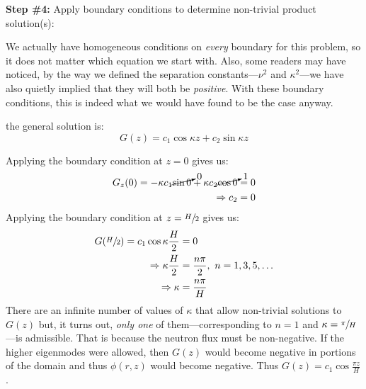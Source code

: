 \vspace{0.25cm}

\noindent\textbf{Step \#4:} Apply boundary conditions to determine non-trivial product solution(s):

\vspace{0.25cm}

\noindent We actually have homogeneous conditions on \emph{every} boundary for this problem, so it does not matter which equation we start with. Also, some readers may have noticed, by the way we defined the separation constants---$\nu^2$ and $\kappa^2$---we have also quietly implied that they will both be \emph{positive}.  With these boundary conditions, this is indeed what we would have found to be the case anyway.

 the general solution is:
\begin{equation*}
G(z) = c_1\cos{\kappa z} + c_2 \sin{\kappa z}
\end{equation*}

Applying the boundary condition at $z=0$ gives us:
\begin{align*}
G_z(0) = -\kappa c_1 \cancelto{0}{\sin{0}} + \kappa c_2 \cancelto{1}{\cos{0}} &= 0 \\
\Rightarrow c_2 &= 0 
\end{align*}
Applying the boundary condition at $z=\sfrac{H}{2}$ gives us:
\begin{align*}
G(\sfrac{H}{2}) = c_1 \cos{\kappa \frac{H}{2}} &= 0 \\
\Rightarrow \kappa \frac{H}{2} &= \frac{n\pi}{2}, \ n=1,3,5,\dots \\
\Rightarrow \kappa &= \frac{n \pi}{H}
\end{align*}
There are an infinite number of values of $\kappa$ that allow non-trivial solutions to $G(z)$ but, it turns out, \emph{only one} of them---corresponding to $n=1$ and $\kappa = \sfrac{\pi}{H}$---is admissible.  That is because the neutron flux must be non-negative.  If the higher eigenmodes were allowed, then $G(z)$ would become negative in portions of the domain and thus $\phi(r,z)$ would become negative. Thus $G(z) = c_1\cos{\frac{\pi z}{H}}$.  

